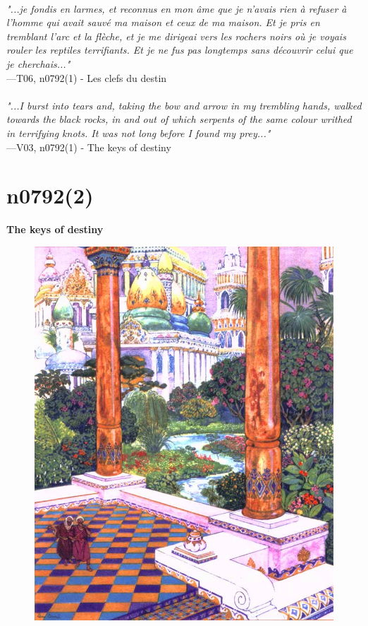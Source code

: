 \documentclass[../Carre_nights.tex]{subfiles}
\begin{document}
\textit{\\
"...je fondis en larmes, et reconnus en mon âme que je n’avais rien à refuser à l’homme qui avait sauvé ma maison et ceux de ma maison. Et je pris en tremblant l’arc et la flèche, et je me dirigeai vers les rochers noirs où je voyais rouler les reptiles terrifiants. Et je ne fus pas longtemps sans découvrir celui que je cherchais..."} \\
—T06, n0792(1) - Les clefs du destin \\~\\
\textit{"...I burst into tears and, taking the bow and arrow in my trembling hands, walked towards the black rocks, in and out of which serpents of the same colour writhed in terrifying knots. It was not long before I found my prey..."} \\
—V03, n0792(1) - The keys of destiny

\newpage

\section{n0792(2)}
\textbf{\Large{The keys of destiny}} \\

\begin{figure}[ht]
\centering
\includegraphics[height=\figsize]{illustrations/volume_6/T06, n0792(2) - Les clefs du destin.jpg}
\end{figure}
\end{document}
